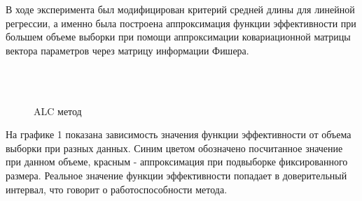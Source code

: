 \documentclass[12pt,twoside]{article}
\begin{document}
В ходе эксперимента был модифицирован критерий средней длины для линейной регрессии, а именно была построена аппроксимация функции эффективности при большем объеме выборки при помощи аппроксимации ковариационной матрицы вектора параметров через матрицу информации Фишера.

\begin{figure}[h!t]\center
{}
\\
\\

\caption{ALC метод}
\label{fig1}
\end{figure}

На графике 1 показана зависимость значения функции эффективности от объема выборки при разных данных. Синим цветом обозначено посчитанное значение при данном объеме, красным - аппроксимация при подвыборке фиксированного размера. Реальное значение функции эффективности попадает в доверительный интервал, что говорит о работоспособности метода.
\end{document}
